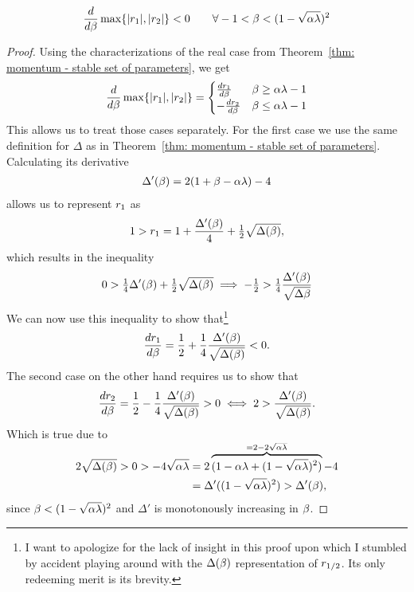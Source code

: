 \begin{lemma}\label{lem-appdx: just at the border of complex case is best beta}
	\begin{align*}
		\frac{d}{d\beta}\max\{|r_1|,|r_2|\} < 0 \qquad
		\forall -1<\beta <(1-\sqrt{\alpha\lambda})^2
	\end{align*}
\end{lemma}
\begin{proof}
	Using the characterizations of the real case
	from Theorem~\ref{thm: momentum - stable set of parameters}, we get
	\begin{align*}
		\frac{d}{d\beta}\max\{|r_1|,|r_2|\}
		= \begin{cases}
			\frac{dr_1}{d\beta} & \beta \ge \alpha\lambda -1 \\
			-\frac{dr_2}{d\beta} & \beta \le \alpha\lambda -1 
		\end{cases}
	\end{align*}
	This allows us to treat those cases separately. For the first case we use
	the same definition for \(\Delta\) as in Theorem~\ref{thm: momentum - stable
	set of parameters}. Calculating its derivative
	\begin{align*}
		\Delta'(\beta) = 2(1+\beta-\alpha\lambda)	-4
	\end{align*}
	allows us to represent \(r_1\) as
	\begin{align*}
		1>r_1
		= 1 + \frac{\Delta'(\beta)}{4} + \tfrac12 \sqrt{\Delta(\beta)},
	\end{align*}
	which results in the inequality
	\begin{align*}
		0 > \tfrac14\Delta'(\beta) + \tfrac12\sqrt{\Delta(\beta)}
		\implies -\tfrac12 > \tfrac14\frac{\Delta'(\beta)}{\sqrt{\Delta{\beta}}}
	\end{align*}
	We can now use this inequality to show that\footnote{
		I want to apologize for the lack of insight in this proof upon which I
		stumbled by accident playing around with the \(\Delta(\beta)\)
		representation of \(r_{1/2}\). Its only redeeming merit is its brevity.
	}
	\begin{align*}
		\frac{dr_1}{d\beta}
		= \frac12 + \frac14 \frac{\Delta'(\beta)}{\sqrt{\Delta(\beta)}} < 0.
	\end{align*}
	The second case on the other hand requires us to show that
	\begin{align*}
		\frac{dr_2}{d\beta}
		= \frac12 - \frac14 \frac{\Delta'(\beta)}{\sqrt{\Delta(\beta)}} > 0
		\iff 2 > \frac{\Delta'(\beta)}{\sqrt{\Delta(\beta)}}.
	\end{align*}
	Which is true due to
	\begin{align*}
		2\sqrt{\Delta(\beta)} > 0 > -4\sqrt{\alpha\lambda}
		&= 2\overbrace{
			(1-\alpha\lambda + (1-\sqrt{\alpha\lambda})^2)
		}^{\smash{=2-2\sqrt{\alpha\lambda}}} -4\\
		&= \Delta'((1-\sqrt{\alpha\lambda})^2) > \Delta'(\beta),
	\end{align*}
	since \(\beta<(1-\sqrt{\alpha\lambda})^2\) and \(\Delta'\) is monotonously
	increasing in \(\beta\).
\end{proof}

